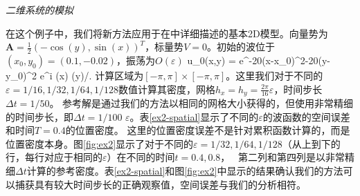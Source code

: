   
 
\begin{exmp}\label{exmp2d}
{\sl 二维系统的模拟}
\end{exmp}
在这个例子中，我们将新方法应用于在中详细描述的基本2D模型。向量势为$\mathbf{A} = \frac{1}{2}(-\cos(y),\sin(x))^T$，标量势$V= 0$。初始的波位于$(x_0,y_0) = (0.1, -0.02)$，振荡为$O(\varepsilon)$
\bea\label{2dInit}
 u_0(x,y) = e^{-20(x-x_0)^2-20(y-y_0)^2} e^{i \sin(x) \sin(y)/\varepsilon}. 
\eea
计算区域为$[-\pi,\pi]\times [-\pi,\pi]$。这里我们对于不同的$\varepsilon = 1/16,1/32,1/64,1/128$数值计算其密度，网格$ h_x = h_y = \frac{2\pi}{16}\varepsilon$，时间步长$\Delta t = 1/50$。
参考解是通过我们的方法以相同的网格大小获得的，但使用非常精细的时间步长，即$\Delta t = 1/100\, \,\varepsilon $。表\ref{ex2-spatial}显示了不同的$\varepsilon$的波函数的空间误差和时间$T = 0.4$的位置密度。 这里的位置密度误差不是针对累积函数计算的，而是位置密度本身。图\ref{fig:ex2}显示了对于不同的$\varepsilon = 1 / 32,1 / 64,1 / 128$（从上到下的行，每行对应于相同的$\varepsilon$）在不同的时间$t = 0.4,0.8$，
 第二列和第四列是以非常精细$\Delta t$计算的参考密度。表\ref{ex2-spatial}和图\ref{fig:ex2}中显示的结果确认我们的方法可以捕获具有较大时间步长的正确观察值，空间误差与我们的分析相符。
 

